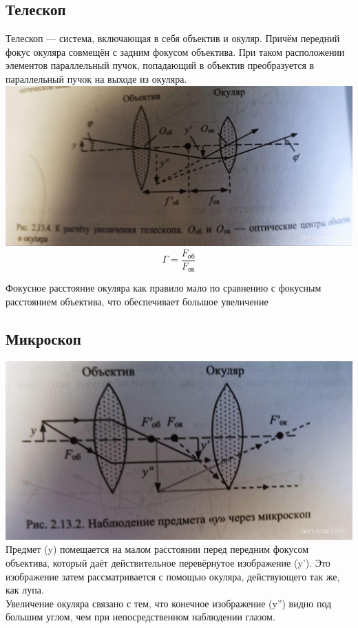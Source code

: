 \subsection{Телескоп}
Телескоп --- система, включающая в себя объектив и окуляр. Причём передний фокус окуляра совмещён с задним фокусом объектива. При таком расположении элементов параллельный пучок, попадающий в объектив преобразуется в параллельный пучок на выходе из окуляра.\\
\includegraphics[width=\textwidth]{parts/img/p2_telescope.jpg}\\
$$\Gamma = \frac{F_{об}}{F_{ок}}$$

Фокусное расстояние окуляра как правило мало по сравнению с фокусным расстоянием объектива, что обеспечивает большое увеличение

\subsection{Микроскоп}
\includegraphics[width=\textwidth]{parts/img/p2_microscope.jpg} \\
Предмет (y) помещается на малом расстоянии перед передним фокусом объектива, который даёт действительное перевёрнутое изображение (y'). Это изображение затем рассматривается с помощью окуляра, действующего так же, как лупа.\\
Увеличение окуляра связано с тем, что конечное изображение (y'') видно под большим углом, чем при непосредственном наблюдении глазом.